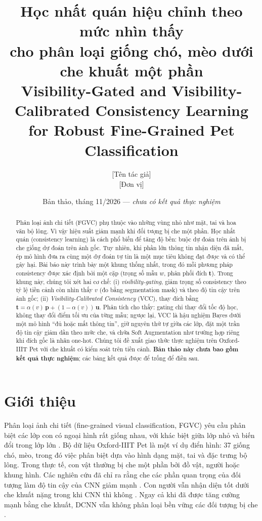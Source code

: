 \documentclass[11pt,a4paper]{article}
\title{\textbf{Học nhất quán hiệu chỉnh theo mức nhìn thấy\\cho phân loại giống chó, mèo dưới che khuất một phần}\\[4pt]
\large Visibility-Gated and Visibility-Calibrated Consistency Learning\\for Robust Fine-Grained Pet Classification}
\author{[Tên tác giả]\\[2pt]\small [Đơn vị]}
\date{Bản thảo, tháng 11/2026 --- \textit{chưa có kết quả thực nghiệm}}
\theoremstyle{plain}
\theoremstyle{definition}
\theoremstyle{remark}
\newcommand{\bp}{\bm{p}}
\newcommand{\bt}{\bm{t}}
\newcommand{\bu}{\bm{u}}
\begin{document}
\maketitle

\begin{abstract}
Phân loại ảnh chi tiết (FGVC) phụ thuộc vào những vùng nhỏ như mặt, tai và hoa văn bộ lông. Vì vậy hiệu suất giảm mạnh khi đối tượng bị che một phần. Học nhất quán (consistency learning) là cách phổ biến để tăng độ bền: buộc dự đoán trên ảnh bị che giống dự đoán trên ảnh gốc. Tuy nhiên, khi phần lớn thông tin nhận diện đã mất, ép mô hình đưa ra cùng một dự đoán tự tin là một mục tiêu không đạt được và có thể gây hại. Bài báo này trình bày một khung thống nhất, trong đó mỗi phương pháp consistency được xác định bởi một cặp (trọng số mẫu $w$, phân phối đích $\bt$). Trong khung này, chúng tôi xét hai cơ chế: (i) \emph{visibility-gating}, giảm trọng số consistency theo tỷ lệ tiền cảnh còn nhìn thấy $v$ (đo bằng segmentation mask) và theo độ tin cậy trên ảnh gốc; (ii) \emph{Visibility-Calibrated Consistency} (VCC), thay đích bằng $\bt = \alpha(v)\,\bp + (1-\alpha(v))\,\bu$. Phân tích cho thấy: gating chỉ thay đổi tốc độ học, không thay đổi điểm tối ưu của từng mẫu; ngược lại, VCC là hậu nghiệm Bayes dưới một mô hình ``đủ hoặc mất thông tin'', giữ nguyên thứ tự giữa các lớp, đặt một trần độ tin cậy giảm dần theo mức che, và chứa Soft Augmentation như trường hợp riêng khi đích gốc là nhãn one-hot. Chúng tôi đề xuất giao thức thực nghiệm trên Oxford-IIIT Pet với che khuất có kiểm soát trên tiền cảnh. \textbf{Bản thảo này chưa bao gồm kết quả thực nghiệm}; các bảng kết quả được để trống để điền sau.
\end{abstract}

\section{Giới thiệu}

Phân loại ảnh chi tiết (fine-grained visual classification, FGVC) yêu cầu phân biệt các lớp con có ngoại hình rất giống nhau, với khác biệt giữa lớp nhỏ và biến đổi trong lớp lớn \cite{wei2022fgia}. Bộ dữ liệu Oxford-IIIT Pet \cite{parkhi2012cats} là một ví dụ điển hình: 37 giống chó, mèo, trong đó việc phân biệt dựa vào hình dạng mặt, tai và đặc trưng bộ lông. Trong thực tế, con vật thường bị che một phần bởi đồ vật, người hoặc khung hình. Các nghiên cứu đã chỉ ra rằng che các phần quan trọng của đối tượng làm độ tin cậy của CNN giảm mạnh \cite{zeiler2014visualizing}. Con người vẫn nhận diện tốt dưới che khuất nặng trong khi CNN thì không \cite{zhu2019robustness}. Ngay cả khi đã được tăng cường mạnh bằng che khuất, DCNN vẫn không phân loại bền vững các đối tượng bị che \cite{kortylewski2020compositional}.
\end{document}
